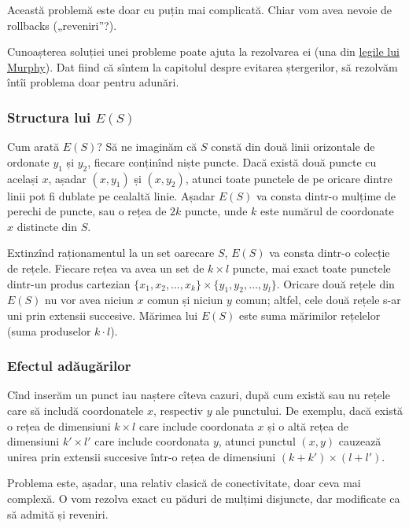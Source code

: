 Această problemă este doar cu puțin mai complicată. Chiar vom avea nevoie de rollbacks („reveniri”?).

Cunoașterea soluției unei probleme poate ajuta la rezolvarea ei (una din \href{https://www.cs.cmu.edu/~fgandon/miscellaneous/murphy/}{legile lui Murphy}). Dat fiind că sîntem la capitolul despre evitarea ștergerilor, să rezolvăm întîi problema doar pentru adunări.

\subsubsection*{Structura lui $E(S)$}

Cum arată $E(S)$? Să ne imaginăm că $S$ constă din două linii orizontale de ordonate $y_1$ și $y_2$, fiecare conținînd niște puncte. Dacă există două puncte cu același  $x$, așadar $(x, y_1)$ și $(x, y_2)$, atunci toate punctele de pe oricare dintre linii pot fi dublate pe cealaltă linie. Așadar $E(S)$ va consta dintr-o mulțime de perechi de puncte, sau o rețea de $2 k$ puncte, unde $k$ este numărul de coordonate $x$ distincte din $S$.

Extinzînd raționamentul la un set oarecare $S$, $E(S)$ va consta dintr-o colecție de rețele. Fiecare rețea va avea un set de $k \times l$ puncte, mai exact toate punctele dintr-un produs cartezian $\{x_1, x_2, \dots, x_k\} \times \{y_1, y_2, \dots, y_l\}$. Oricare două rețele din $E(S)$ nu vor avea niciun $x$ comun și niciun $y$ comun; altfel, cele două rețele s-ar uni prin extensii succesive. Mărimea lui $E(S)$ este suma mărimilor rețelelor (suma produselor $k \cdot l$).

\subsubsection*{Efectul adăugărilor}

Cînd inserăm un punct iau naștere cîteva cazuri, după cum există sau nu rețele care să includă coordonatele $x$, respectiv $y$ ale punctului. De exemplu, dacă există o rețea de dimensiuni $k \times l$ care include coordonata $x$ și o altă rețea de dimensiuni $k' \times l'$ care include coordonata $y$, atunci punctul $(x,y)$ cauzează unirea prin extensii succesive într-o rețea de dimensiuni $(k + k') \times (l + l')$.

Problema este, așadar, una relativ clasică de conectivitate, doar ceva mai complexă. O vom rezolva exact cu păduri de mulțimi disjuncte, dar modificate ca să admită și reveniri.


